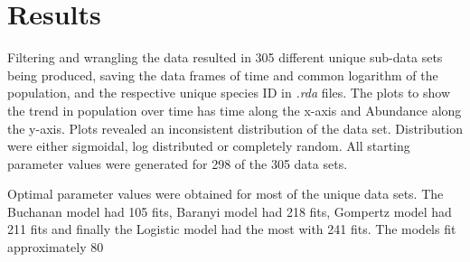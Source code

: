 \documentclass[11pt]{article}
\begin{document}
\section{Results}
Filtering and wrangling the data resulted in 305 different unique sub-data sets being produced, saving the data frames of time and common logarithm of the population, and the respective unique species ID in \textit{.rda} files. The plots to show the trend in population over time has time along the x-axis and Abundance along the y-axis. Plots revealed an inconsistent distribution of the data set. Distribution were either sigmoidal, log distributed or completely random.  All starting parameter values were generated for 298 of the 305 data sets.

Optimal parameter values were obtained for most of the unique data sets. The Buchanan model had 105 fits, Baranyi model had 218 fits, Gompertz model had 211 fits and finally the Logistic model had the most with 241 fits. The models fit approximately 80%
\end{document}
